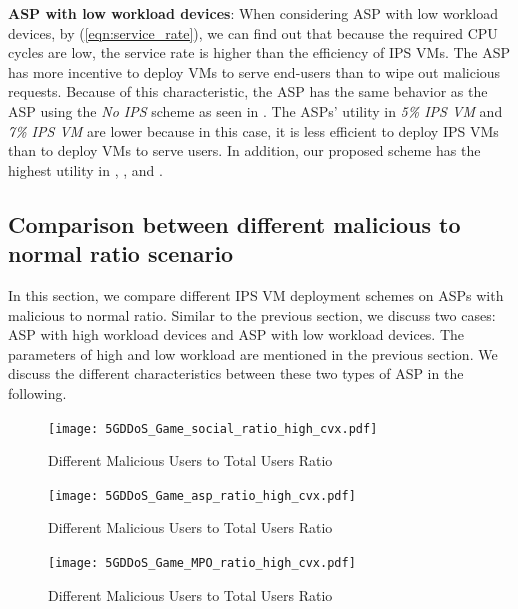 \documentclass[conference]{IEEEtran}
\begin{document}
\textbf{ASP with low workload devices}:
When considering ASP with low workload devices, by (\ref{eqn:service_rate}), we can find out that because the required CPU cycles are low, the service rate is higher than the efficiency of IPS VMs. The ASP has more incentive to deploy VMs to serve end-users than to wipe out malicious requests. Because of this characteristic, the ASP has the same behavior as the ASP using the \textit{No IPS} scheme as seen in . The ASPs' utility in \textit{5\% IPS VM} and \textit{7\% IPS VM} are lower because in this case, it is less efficient to deploy IPS VMs than to deploy VMs to serve users. In addition, our proposed scheme has the highest utility in , , and .

\subsection{Comparison between different malicious to normal ratio scenario}
In this section, we compare different IPS VM deployment schemes on ASPs with malicious to normal ratio. Similar to the previous section, we discuss two cases: ASP with high workload devices and ASP with low workload devices. The parameters of high and low workload are mentioned in the previous section. We discuss the different characteristics between these two types of ASP in the following. 



\begin{figure}[!ht]
  \texttt{[image: 5GDDoS\_Game\_social\_ratio\_high\_cvx.pdf]}
    \caption{Different Malicious Users to Total Users Ratio}
\label{fig:ratio_soc_high}
\end{figure}

\begin{figure}[!ht]
  \texttt{[image: 5GDDoS\_Game\_asp\_ratio\_high\_cvx.pdf]}
    \caption{Different Malicious Users to Total Users Ratio}
\label{fig:ratio_asp_high}
\end{figure}

\begin{figure}[!ht]
  \texttt{[image: 5GDDoS\_Game\_MPO\_ratio\_high\_cvx.pdf]}
    \caption{Different Malicious Users to Total Users Ratio}
\label{fig:ratio_mpo_high}
\end{figure}
\end{document}
